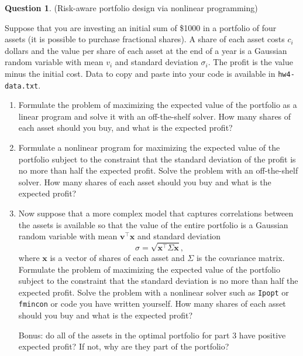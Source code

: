 \documentclass{article}
\theoremstyle{definition}
\newtheorem{question}[thm]{Question}
\begin{document}
\begin{question}(Risk-aware portfolio design via nonlinear programming)

    Suppose that you are investing an initial sum of \$1000 in a portfolio of four assets (it is possible to purchase fractional shares).
    A share of each asset costs $c_i$ dollars and the value per share of each asset at the end of a year is a Gaussian random variable with mean $v_i$ and standard deviation $\sigma_i$. The profit is the value minus the initial cost. Data to copy and paste into your code is available in \texttt{hw4-data.txt}.
    \begin{enumerate}
        \item Formulate the problem of maximizing the expected value of the portfolio as a linear program and solve it with an off-the-shelf solver. How many shares of each asset should you buy, and what is the expected profit?
        \item Formulate a nonlinear program for maximizing the expected value of the portfolio subject to the constraint that the standard deviation of the profit is no more than half the expected profit. Solve the problem with an off-the-shelf solver. How many shares of each asset should you buy and what is the expected profit?
        \item Now suppose that a more complex model that captures correlations between the assets is available so that the value of the entire portfolio is a Gaussian random variable with mean $\mathbf{v}^\top \mathbf{x}$ and standard deviation $$\sigma = \sqrt{\mathbf{x}^\top \Sigma \mathbf{x}} \text{,}$$ where $\mathbf{x}$ is a vector of shares of each asset and $\Sigma$ is the covariance matrix. Formulate the problem of maximizing the expected value of the portfolio subject to the constraint that the standard deviation is no more than half the expected profit. Solve the problem with a nonlinear solver such as \texttt{Ipopt} or \texttt{fmincon} or code you have written yourself. How many shares of each asset should you buy and what is the expected profit?
        
        Bonus: do all of the assets in the optimal portfolio for part 3 have positive expected profit? If not, why are they part of the portfolio?
    \end{enumerate}
\end{question}
\end{document}
